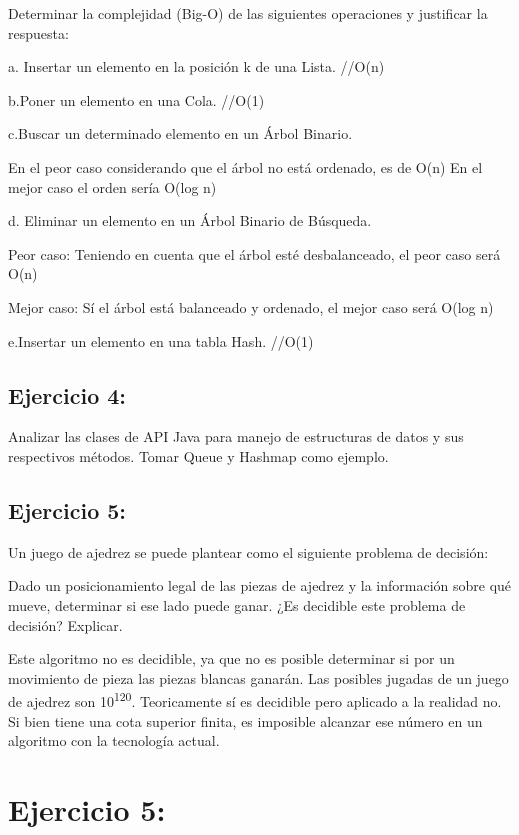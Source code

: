 \documentclass[11pt]{article}
\begin{document}
Determinar la complejidad (Big-O) de las siguientes operaciones y justificar la respuesta:

a. Insertar un elemento en la posición k de una Lista. //O(n)

b.Poner un elemento en una Cola. //O(1)

c.Buscar un determinado elemento en un Árbol Binario. 

En el peor caso considerando que el árbol no está ordenado, es de O(n)
En el mejor caso el orden sería O(log n)



d. Eliminar un elemento en un Árbol Binario de Búsqueda.

Peor caso: Teniendo en cuenta que el árbol esté desbalanceado, el peor
caso será O(n)


Mejor caso: Sí el árbol está balanceado y ordenado, el mejor caso será
O(log n)

e.Insertar un elemento en una tabla Hash. //O(1)

\subsection{Ejercicio 4:}
\label{sec:org34224d8}

Analizar las clases de API Java para manejo de estructuras de datos y sus respectivos
métodos. Tomar Queue y Hashmap como ejemplo.


\subsection{Ejercicio 5:}
\label{sec:org0bbc145}

Un juego de ajedrez se puede plantear como el siguiente problema de decisión:

Dado un posicionamiento legal de las piezas de ajedrez y la información sobre qué mueve,
determinar si ese lado puede ganar. ¿Es decidible este problema de decisión? Explicar.

Este algoritmo no es decidible, ya que no es posible determinar si por
un movimiento de pieza las piezas blancas ganarán. Las posibles
jugadas de un juego de ajedrez son 10\textsuperscript{120}.
Teoricamente sí es decidible pero aplicado a la realidad no. Si bien
tiene una cota superior finita, es imposible alcanzar ese número en un
algoritmo con la tecnología actual.



\section{Ejercicio 5:}
\label{sec:org753dd78}
\end{document}
